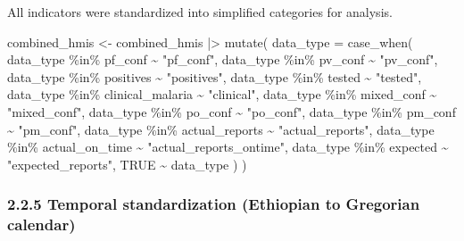 \documentclass[
  letterpaper,
  DIV=11,
  numbers=noendperiod]{scrartcl}
\newenvironment{Shaded}{\begin{snugshade}}{\end{snugshade}}
\newcommand{\AttributeTok}[1]{\textcolor[rgb]{0.40,0.45,0.13}{#1}}
\newcommand{\ConstantTok}[1]{\textcolor[rgb]{0.56,0.35,0.01}{#1}}
\newcommand{\FunctionTok}[1]{\textcolor[rgb]{0.28,0.35,0.67}{#1}}
\newcommand{\NormalTok}[1]{\textcolor[rgb]{0.00,0.23,0.31}{#1}}
\newcommand{\OtherTok}[1]{\textcolor[rgb]{0.00,0.23,0.31}{#1}}
\newcommand{\SpecialCharTok}[1]{\textcolor[rgb]{0.37,0.37,0.37}{#1}}
\newcommand{\StringTok}[1]{\textcolor[rgb]{0.13,0.47,0.30}{#1}}
\begin{document}
All indicators were standardized into simplified categories for
analysis.

\begin{Shaded}
\begin{Highlighting}[]
\NormalTok{combined\_hmis }\OtherTok{\textless{}{-}}\NormalTok{ combined\_hmis }\SpecialCharTok{|\textgreater{}}
  \FunctionTok{mutate}\NormalTok{(}
    \AttributeTok{data\_type =} \FunctionTok{case\_when}\NormalTok{(}
\NormalTok{      data\_type }\SpecialCharTok{\%in\%}\NormalTok{ pf\_conf }\SpecialCharTok{\textasciitilde{}} \StringTok{"pf\_conf"}\NormalTok{,}
\NormalTok{      data\_type }\SpecialCharTok{\%in\%}\NormalTok{ pv\_conf }\SpecialCharTok{\textasciitilde{}} \StringTok{"pv\_conf"}\NormalTok{,}
\NormalTok{      data\_type }\SpecialCharTok{\%in\%}\NormalTok{ positives }\SpecialCharTok{\textasciitilde{}} \StringTok{"positives"}\NormalTok{,}
\NormalTok{      data\_type }\SpecialCharTok{\%in\%}\NormalTok{ tested }\SpecialCharTok{\textasciitilde{}} \StringTok{"tested"}\NormalTok{,}
\NormalTok{      data\_type }\SpecialCharTok{\%in\%}\NormalTok{ clinical\_malaria }\SpecialCharTok{\textasciitilde{}} \StringTok{"clinical"}\NormalTok{,}
\NormalTok{      data\_type }\SpecialCharTok{\%in\%}\NormalTok{ mixed\_conf }\SpecialCharTok{\textasciitilde{}} \StringTok{"mixed\_conf"}\NormalTok{,}
\NormalTok{      data\_type }\SpecialCharTok{\%in\%}\NormalTok{ po\_conf }\SpecialCharTok{\textasciitilde{}} \StringTok{"po\_conf"}\NormalTok{,}
\NormalTok{      data\_type }\SpecialCharTok{\%in\%}\NormalTok{ pm\_conf }\SpecialCharTok{\textasciitilde{}} \StringTok{"pm\_conf"}\NormalTok{,}
\NormalTok{      data\_type }\SpecialCharTok{\%in\%}\NormalTok{ actual\_reports }\SpecialCharTok{\textasciitilde{}} \StringTok{"actual\_reports"}\NormalTok{,}
\NormalTok{      data\_type }\SpecialCharTok{\%in\%}\NormalTok{ actual\_on\_time }\SpecialCharTok{\textasciitilde{}} \StringTok{"actual\_reports\_ontime"}\NormalTok{,}
\NormalTok{      data\_type }\SpecialCharTok{\%in\%}\NormalTok{ expected }\SpecialCharTok{\textasciitilde{}} \StringTok{"expected\_reports"}\NormalTok{,}
      \ConstantTok{TRUE} \SpecialCharTok{\textasciitilde{}}\NormalTok{ data\_type}
\NormalTok{    )}
\NormalTok{  )}
\end{Highlighting}
\end{Shaded}

\subsubsection{2.2.5 Temporal standardization (Ethiopian to Gregorian
calendar)}\label{temporal-standardization-ethiopian-to-gregorian-calendar}
\end{document}
